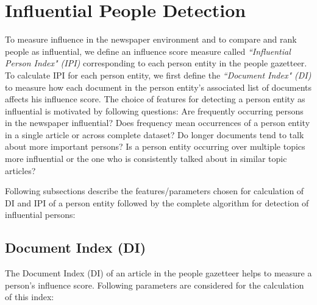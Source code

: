 \documentclass[10pt,journal,compsoc]{IEEEtran}
\begin{document}


\section{Influential People Detection}
\label{influential}

To measure influence in the newspaper environment and to compare and rank people as influential, we define an influence score measure called \textit{``Influential Person Index" (IPI)} corresponding to each person entity in the people gazetteer. To calculate IPI for each person entity, we first define the \textit{``Document Index" (DI)} to measure how each document in the person entity's associated list of documents affects his influence score.
The choice of features for detecting a person entity as influential is motivated by following questions: Are frequently occurring persons in the newspaper influential? Does frequency mean occurrences of a person entity in a single article or across complete dataset? Do longer documents tend to talk about more important persons? Is a person entity occurring over multiple topics more influential or the one who is consistently talked about in similar topic articles? 

Following subsections describe the features/parameters chosen for calculation of DI and IPI of a person entity followed by the complete algorithm for detection of influential persons:

\subsection{Document Index (DI)}
\label{influential:DI}
The Document Index (DI) of an article in the people gazetteer helps to measure a person's influence score. Following parameters are considered for the calculation of this index:
\end{document}
